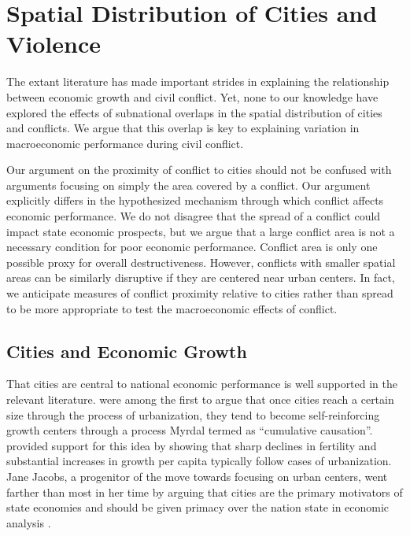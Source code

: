 
\section{Spatial Distribution of Cities and Violence}
\label{theory}

The extant literature has made important strides in explaining the relationship between economic growth and civil conflict. Yet, none to our knowledge have explored the effects of subnational overlaps in the spatial distribution of cities and conflicts. We argue that this overlap is key to explaining variation in macroeconomic performance during civil conflict. 

Our argument on the proximity of conflict to cities should not be confused with arguments focusing on simply the area covered by a conflict. Our argument explicitly differs in the hypothesized mechanism through which conflict affects economic performance. We do not disagree that the spread of a conflict could impact state economic prospects, but we argue that a large conflict area is not a necessary condition for poor economic performance. Conflict area is only one possible proxy for overall destructiveness. However, conflicts with smaller spatial areas can be similarly disruptive if they are centered near urban centers. In fact, we anticipate measures of conflict proximity relative to cities rather than spread to be more appropriate to test the macroeconomic effects of conflict.

\subsection{Cities and Economic Growth}

That cities are central to national economic performance is well supported in the relevant literature. \citet{myrdal:sitohang:1957} were among the first to argue that once cities reach a certain size through the process of urbanization, they tend to become self-reinforcing growth centers through a process Myrdal termed as ``cumulative causation''. \citet{chenery:syrquin:1975} provided support for this idea by showing that sharp declines in fertility and substantial increases in growth per capita typically follow cases of urbanization. Jane Jacobs, a progenitor of the move towards focusing on urban centers, went farther than most in her time by arguing that cities are the primary motivators of state economies and should be given primacy over the nation state in economic analysis \citep{jacobs:1969,jacobs:1984}. 

